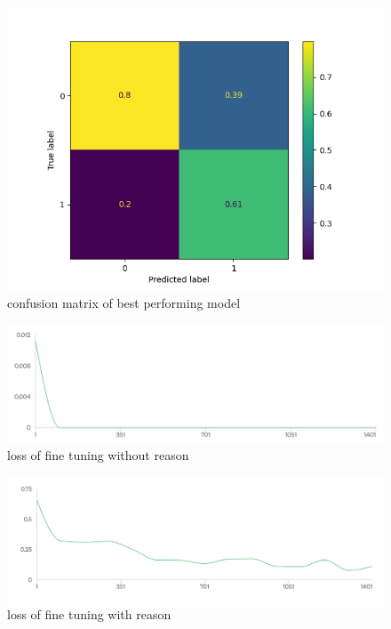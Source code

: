 \documentclass[11pt,english]{report}
\begin{document}
\begin{figure}[H]
\caption{confusion matrix of best performing model}
\centering
\includegraphics[width=13cm]{Figures/confusion_matrix.png}
\end{figure}

\begin{figure}[H]
\caption{loss of fine tuning without reason}
\centering
\includegraphics[width=17cm]{Figures/no_reason_1000.png}
\end{figure}

\begin{figure}[H]
\caption{loss of fine tuning with reason}
\centering
\includegraphics[width=17cm]{Figures/with_reason_1000.png}
\end{figure}

\newpage



\begin{appendices}
\end{appendices}
\end{document}
